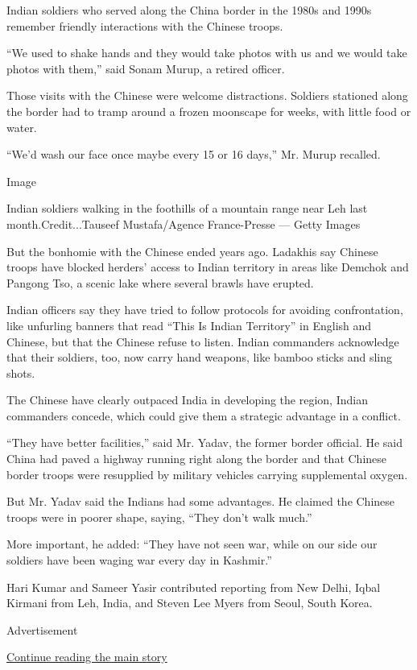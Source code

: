 Indian soldiers who served along the China border in the 1980s and 1990s
remember friendly interactions with the Chinese troops.

``We used to shake hands and they would take photos with us and we would
take photos with them,'' said Sonam Murup, a retired officer.

Those visits with the Chinese were welcome distractions. Soldiers
stationed along the border had to tramp around a frozen moonscape for
weeks, with little food or water.

``We'd wash our face once maybe every 15 or 16 days,'' Mr. Murup
recalled.

Image

Indian soldiers walking in the foothills of a mountain range near Leh
last month.Credit...Tauseef Mustafa/Agence France-Presse --- Getty
Images

But the bonhomie with the Chinese ended years ago. Ladakhis say Chinese
troops have blocked herders' access to Indian territory in areas like
Demchok and Pangong Tso, a scenic lake where several brawls have
erupted.

Indian officers say they have tried to follow protocols for avoiding
confrontation, like unfurling banners that read ``This Is Indian
Territory'' in English and Chinese, but that the Chinese refuse to
listen. Indian commanders acknowledge that their soldiers, too, now
carry hand weapons, like bamboo sticks and sling shots.

The Chinese have clearly outpaced India in developing the region, Indian
commanders concede, which could give them a strategic advantage in a
conflict.

``They have better facilities,'' said Mr. Yadav, the former border
official. He said China had paved a highway running right along the
border and that Chinese border troops were resupplied by military
vehicles carrying supplemental oxygen.

But Mr. Yadav said the Indians had some advantages. He claimed the
Chinese troops were in poorer shape, saying, ``They don't walk much.''

More important, he added: ``They have not seen war, while on our side
our soldiers have been waging war every day in Kashmir.''

Hari Kumar and Sameer Yasir contributed reporting from New Delhi, Iqbal
Kirmani from Leh, India, and Steven Lee Myers from Seoul, South Korea.

Advertisement

\protect\hyperlink{after-bottom}{Continue reading the main story}

